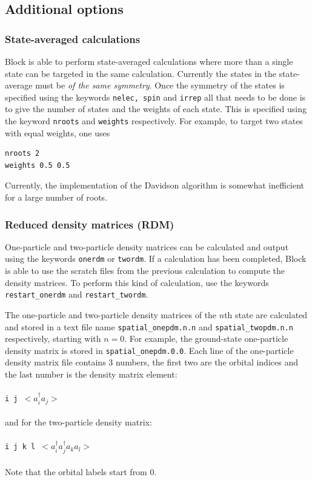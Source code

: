 \documentclass[letterpaper,12pt,aps, pra]{revtex4-1}
\begin{document}
\subsection{Additional options}

\subsubsection{State-averaged calculations}
Block is able to perform state-averaged calculations where more than a single state can be targeted in the same calculation. Currently 
the states in the state-average must be \emph{of the same symmetry}. Once the symmetry of the states is specified using the keywords \texttt{nelec, spin} and \texttt{irrep} 
all that needs to be done is to give the number of states and the weights of each state. This is specified using the keyword \texttt{nroots} and \texttt{weights} respectively. For example, to target two states with equal weights, one uses
\begin{verbatim}
nroots 2
weights 0.5 0.5
\end{verbatim}
Currently, the implementation of the Davidson algorithm is somewhat inefficient for a large number of roots.

\subsubsection{Reduced density matrices (RDM)}

One-particle and two-particle density matrices can be calculated and output using the keywords \texttt{onerdm} or \texttt{twordm}.
If a calculation has been completed, Block is able to use the scratch files from the previous calculation to compute
the density matrices. To perform this kind of calculation,  use the keywords \texttt{restart\_onerdm} and \texttt{restart\_twordm}.

The one-particle and two-particle density matrices of the $n$th state are calculated and stored in a text file name \texttt{spatial\_onepdm.n.n} and \texttt{spatial\_twopdm.n.n} respectively, starting with $n=0$. For example, the ground-state one-particle density matrix is stored in \texttt{spatial\_onepdm.0.0}.
Each line of the one-particle density matrix file contains 3 numbers, the first two
are the orbital indices and the last number is the density matrix element:\\
\texttt{
\\i j $<a_i^\dag a_j>$\\
}
\\and for the two-particle density matrix:\\
\texttt{
\\i j k l $<a_i^\dag a_j^\dag a_k a_l>$\\
}
\\Note that the orbital labels start from 0.
\end{document}
